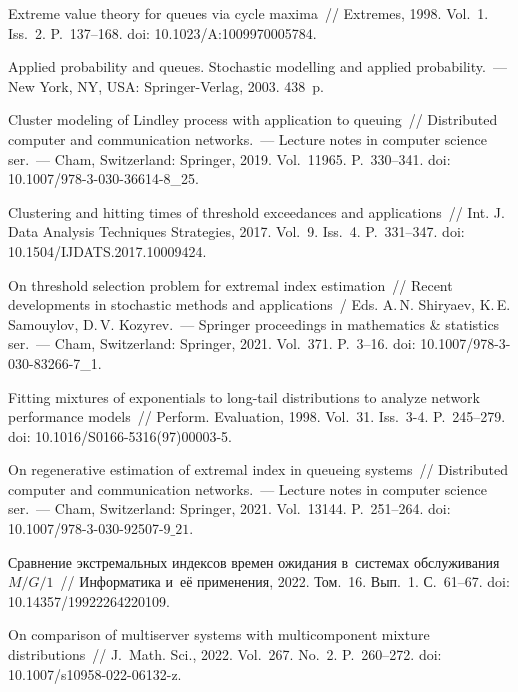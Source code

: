 \begin{multicols}{2}
{{\begin{thebibliography}{99}
 Extreme value theory for queues via cycle maxima~// Extremes, 
1998. Vol.~1. Iss.~2. P.~137--168. doi: 10.1023/A:1009970005784.

 Applied probability and queues. Stochastic modelling and  applied
probability.~--- New York, NY, USA: Springer-Verlag, 2003. 438~p.


 Cluster modeling of Lindley process with 
application to queuing~// Distributed computer and communication networks.~--- Lecture notes in computer 
science ser.~--- Cham, Switzerland: Springer, 2019. Vol.~11965.
P.~330--341. doi:  10.1007/978-3-030-36614-8\_25.

 Clustering and hitting times of threshold exceedances and 
applications~// Int. J. Data Analysis Techniques Strategies, 2017.  Vol.~9. Iss.~4. P.~331--347.
doi: 10.1504/IJDATS.2017.10009424.

 On threshold selection problem for extremal index estimation~// 
Recent developments in stochastic methods and applications~/ Eds. A.\,N. Shiryaev, 
K.\,E. Samouylov, D.\,V. Kozyrev.~--- Springer proceedings in mathematics \& 
statistics ser.~--- Cham, Switzerland: Springer, 2021. Vol.~371. P.~3--16. doi: 
10.1007/978-3-030-83266-7\_1.

 Fitting mixtures of exponentials to 
long-tail distributions to analyze network performance models~//
Perform. Evaluation, 1998. Vol.~31. Iss.~3-4.  P.~245--279. doi: 
10.1016/S0166-5316(97)00003-5.

 On regenerative 
estimation of extremal index in queueing systems~// Distributed computer and 
communication networks.~--- Lecture notes in computer science ser.~--- Cham, Switzerland: 
Springer, 2021. Vol.~13144. P.~251--264. doi: 10.1007/978-3-030-92507-$9\_21$.

Сравнение экстремальных индексов времен ожидания в~системах обслуживания $M/G/1$~//
Информатика и~её применения, 2022.
Том.~16. Вып.~1. С.~61--67. doi: 10.14357/19922264220109.


 On comparison of 
multiserver systems with multicomponent mixture distributions~// J.~Math. Sci., 2022. Vol.~267. No.~2. P.~260--272. doi:  
10.1007/s10958-022-06132-z.




\end{thebibliography}}}
\end{multicols}
